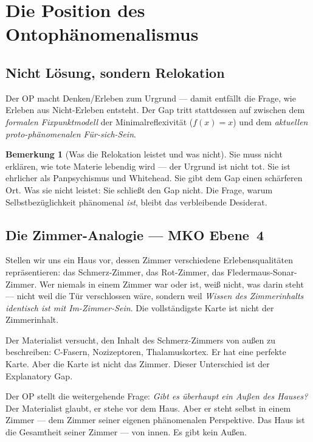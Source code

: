 \documentclass[11pt,a4paper]{article}
\theoremstyle{plain}
\theoremstyle{definition}
\newtheorem{remark}{Bemerkung}[section]
\begin{document}
\section{Die Position des Ontoph\"{a}nomenalismus}

\subsection{Nicht L\"{o}sung, sondern Relokation}

Der OP macht Denken/Erleben zum Urgrund --- damit entf\"{a}llt die Frage, wie Erleben aus
Nicht-Erleben entsteht. Der Gap tritt stattdessen auf zwischen dem \emph{formalen
Fixpunktmodell} der Minimalreflexivit\"{a}t ($f(x)=x$) und dem \emph{aktuellen
proto-ph\"{a}nomenalen F\"{u}r-sich-Sein}.

\begin{remark}[Was die Relokation leistet und was nicht]
Sie muss nicht erkl\"{a}ren, wie tote Materie lebendig wird --- der Urgrund ist nicht
tot. Sie ist ehrlicher als Panpsychismus und Whitehead. Sie gibt dem Gap einen sch\"{a}rferen
Ort. Was sie nicht leistet: Sie schlie\ss{}t den Gap nicht. Die Frage, warum
Selbstbez\"{u}glichkeit ph\"{a}nomenal \emph{ist}, bleibt das verbleibende Desiderat.
\end{remark}

\subsection{Die Zimmer-Analogie --- MKO Ebene~4}

Stellen wir uns ein Haus vor, dessen Zimmer verschiedene Erlebensqualit\"{a}ten
repr\"{a}sentieren: das Schmerz-Zimmer, das Rot-Zimmer, das Fledermaus-Sonar-Zimmer. Wer
niemals in einem Zimmer war oder ist, wei\ss{} nicht, was darin steht --- nicht weil die
T\"{u}r verschlossen w\"{a}re, sondern weil \emph{Wissen des Zimmerinhalts identisch ist
mit Im-Zimmer-Sein}. Die vollst\"{a}ndigste Karte ist nicht der Zimmerinhalt.

Der Materialist versucht, den Inhalt des Schmerz-Zimmers von au\ss{}en zu beschreiben:
C-Fasern, Nozizeptoren, Thalamuskortex. Er hat eine perfekte Karte. Aber die Karte ist
nicht das Zimmer. Dieser Unterschied ist der Explanatory Gap.

Der OP stellt die weitergehende Frage: \emph{Gibt es \"{u}berhaupt ein Au\ss{}en des
Hauses?} Der Materialist glaubt, er stehe vor dem Haus. Aber er steht selbst in einem
Zimmer --- dem Zimmer seiner eigenen ph\"{a}nomenalen Perspektive. Das Haus ist die
Gesamtheit seiner Zimmer --- von innen. Es gibt kein Au\ss{}en.
\end{document}
